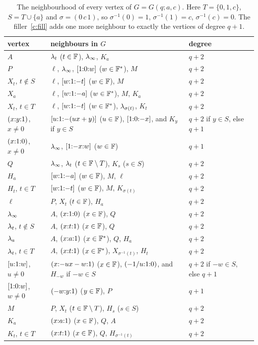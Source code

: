 \begin{table}[ht]
\centering\small
\renewcommand{\arraystretch}{1.15}
\begin{tabular}{@{}lll@{}}
\toprule
vertex & neighbours in $G$ & degree\\
\midrule
$A$ & $\lambda_t$ ($t \in \mathbb{F}$), $\lambda_\infty$, $K_a$ & $q+2$\\
$P$ & $\ell$, $\lambda_\infty$, $[{1}{:}{0}{:}{w}]$ ($w \in \mathbb{F}^*$), $M$ & $q+2$\\
$X_t$, $t \notin S$ & $\ell$, $[{w}{:}{1}{:}{-t}]$ ($w \in \mathbb{F}$), $M$ & $q+2$\\
$X_a$ & $\ell$, $[{w}{:}{1}{:}{-a}]$ ($w \in \mathbb{F}^*$), $M$, $K_a$ & $q+2$\\
$X_t$, $t \in T$ & $\ell$, $[{w}{:}{1}{:}{-t}]$ ($w \in \mathbb{F}^*$), $\lambda_{\sigma(t)}$, $K_t$ & $q+2$\\
$({x}{:}{y}{:}{1})$, $x \ne 0$ & $[{u}{:}{1}{:}{-(ux+y)}]$ ($u \in \mathbb{F}$), $[{1}{:}{0}{:}{-x}]$, and $K_y$ if $y \in S$ & $q+2$ if $y \in S$, else $q+1$\\
$({x}{:}{1}{:}{0})$, $x \ne 0$ & $\lambda_\infty$, $[{1}{:}{-x}{:}{w}]$ ($w \in \mathbb{F}$) & $q+1$\\
$Q$ & $\lambda_\infty$, $\lambda_t$ ($t \in \mathbb{F}\setminus T$), $K_s$ ($s \in S$) & $q+2$\\
$H_a$ & $[{w}{:}{1}{:}{-a}]$ ($w \in \mathbb{F}$), $M$, $\ell$ & $q+2$\\
$H_t$, $t \in T$ & $[{w}{:}{1}{:}{-t}]$ ($w \in \mathbb{F}$), $M$, $K_{\sigma(t)}$ & $q+2$\\
\midrule
$\ell$ & $P$, $X_t$ ($t \in \mathbb{F}$), $H_a$ & $q+2$\\
$\lambda_\infty$ & $A$, $({x}{:}{1}{:}{0})$ ($x \in \mathbb{F}$), $Q$ & $q+2$\\
$\lambda_t$, $t \notin S$ & $A$, $({x}{:}{t}{:}{1})$ ($x \in \mathbb{F}$), $Q$ & $q+2$\\
$\lambda_a$ & $A$, $({x}{:}{a}{:}{1})$ ($x \in \mathbb{F}^*$), $Q$, $H_a$ & $q+2$\\
$\lambda_t$, $t \in T$ & $A$, $({x}{:}{t}{:}{1})$ ($x \in \mathbb{F}^*$), $X_{\sigma^{-1}(t)}$, $H_t$ & $q+2$\\
$[{u}{:}{1}{:}{w}]$, $u \ne 0$ & $({x}{:}{-ux-w}{:}{1})$ ($x \in \mathbb{F}$), $({-1/u}{:}{1}{:}{0})$, and $H_{-w}$ if $-w \in S$ & $q+2$ if $-w \in S$, else $q+1$\\
$[{1}{:}{0}{:}{w}]$, $w \ne 0$ & $({-w}{:}{y}{:}{1})$ ($y \in \mathbb{F}$), $P$ & $q+1$\\
$M$ & $P$, $X_t$ ($t \in \mathbb{F} \setminus T$), $H_s$ ($s \in S$) & $q+2$\\
$K_a$ & $({x}{:}{a}{:}{1})$ ($x \in \mathbb{F}$), $Q$, $A$ & $q+2$\\
$K_t$, $t \in T$ & $({x}{:}{t}{:}{1})$ ($x \in \mathbb{F}$), $Q$, $H_{\sigma^{-1}(t)}$ & $q+2$\\
\bottomrule
\end{tabular}
\caption{The neighbourhood of every vertex of $G = G(q;a,c)$. Here $T = \{0,1,c\}$, $S = T \cup \{a\}$ and $\sigma = (0\,c\,1)$, so $\sigma^{-1}(0) = 1$, $\sigma^{-1}(1) = c$, $\sigma^{-1}(c) = 0$. The filler~\ref{c:fill} adds one more neighbour to exactly the vertices of degree $q+1$.}
\label{tab:nbrs}
\end{table}

